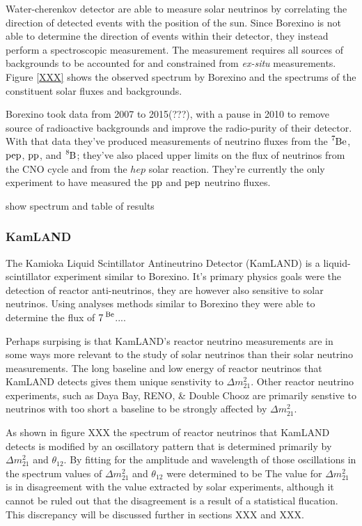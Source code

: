 Water-cherenkov detector are able to measure solar neutrinos by correlating the
direction of detected events with the position of the sun. Since Borexino is not
able to determine the direction of events within their detector, they instead
perform a spectroscopic measurement. The measurement requires
all sources of backgrounds to be accounted for and constrained from \textit{ex-situ}
measurements. Figure \ref{XXX} shows the observed spectrum by Borexino and the
spectrums of the constituent solar fluxes and backgrounds.

Borexino took data from 2007 to 2015(???), with a pause in 2010 to remove source
of radioactive backgrounds and improve the radio-purity of their detector.
With that data they've produced measurements of neutrino fluxes from the $\ce{^{7}Be}$,
$\ce{pep}$, $\ce{pp}$, and $\ce{^{8}B}$; they've also placed upper limits on the flux
of neutrinos from the CNO cycle and from the $hep$ solar reaction.
They're currently the only experiment to have measured the $\ce{pp}$ and $\ce{pep}$ neutrino
fluxes.

show spectrum and table of results

\subsubsection{KamLAND}
The Kamioka Liquid Scintillator Antineutrino Detector (KamLAND) is a liquid-scintillator experiment similar to Borexino.
It's primary physics goals were the detection of reactor anti-neutrinos, they are
however also sensitive to solar neutrinos.
Using analyses methods similar to Borexino they were able to determine the flux
of $\ce{7^{Be}}$.... %

Perhaps surpising is that KamLAND's reactor neutrino measurements are in some ways
more relevant to the study of solar neutrinos than their solar neutrino measurements.
The long baseline and low energy of reactor neutrinos that KamLAND detects gives
them unique senstivity to $\Delta m^{2}_{21}$. Other reactor neutrino experiments,
such as Daya Bay, RENO, \& Double Chooz are primarily senstive to neutrinos
with too short a baseline to be strongly affected by $\Delta m^{2}_{21}$.

As shown in figure XXX %
the spectrum of reactor neutrinos that KamLAND detects is modified by an oscillatory
pattern that is determined primarily by $\Delta m^{2}_{21}$ and $\theta_{12}$.
By fitting for the amplitude and wavelength of those oscillations in the
spectrum values of $\Delta m^{2}_{21}$ and $\theta_{12}$ were determined
to be %
The value for $\Delta m^{2}_{21}$ is in disagreement with the value extracted
by solar experiments, although it cannot be ruled out that the disagreement
is a result of a statistical flucation. This discrepancy will be discussed further
in sections XXX and XXX.

